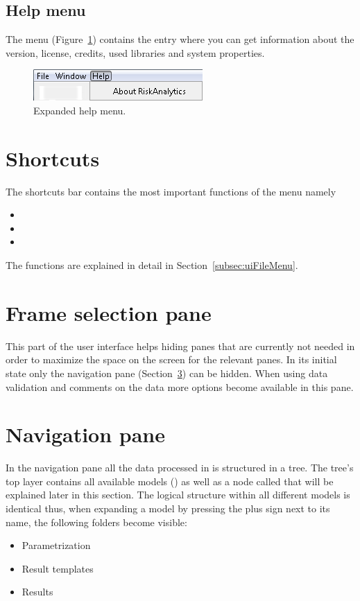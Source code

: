 \subsection{Help menu}
\label{subsec:uiHelpMenu}

The menu  (\cf Figure~\ref{fig:menuHelp}) contains the entry  where you can get information about the version, license, credits, used libraries and system properties.

\begin{figure}[htb]
	\centering
		\includegraphics[scale=0.6]{images/menuHelp.png}
	\caption{Expanded help menu.}
	\label{fig:menuHelp}
\end{figure}

\section{Shortcuts}
\label{sec:uiShortcuts}

The shortcuts bar contains the most important functions of the  menu namely
\begin{itemize}
\item {}
\item {}
\item {}
\end{itemize}
The functions are explained in detail in Section~\ref{subsec:uiFileMenu}.

\section{Frame selection pane}
\label{sec:uiFrameSelection}

This part of the user interface helps hiding panes that are currently not needed in order to maximize the space on the screen for the relevant panes. In its initial state only the navigation pane (\cf Section~\ref{sec:uiNavigation}) can be hidden. When using data validation and comments on the data more options become available in this pane.

\section{Navigation pane}
\label{sec:uiNavigation}

In the navigation pane all the data processed in \RA{} is structured in a tree. The tree's top layer contains all available models (\eg \PODRA{}) as well as a node called  that will be explained later in this section. The logical structure within all different models is identical thus, when expanding a model by pressing the plus sign next to its name, the following folders become visible:
\begin{itemize}
\item Parametrization
\item Result templates
\item Results
\end{itemize}

